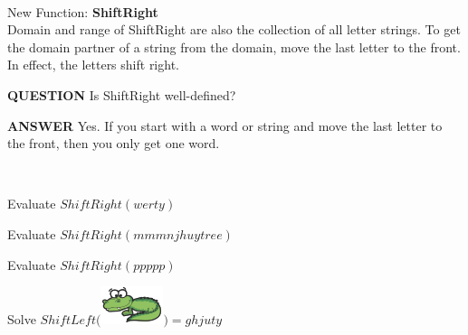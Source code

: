 \documentclass{ximera}
\begin{document}
\begin{exploration}
\quad \\
New Function: \textbf{ShiftRight} \\
Domain and range of ShiftRight are also the collection of all letter strings. To get the domain partner of a string from the domain, move the last letter to the front.  In effect, the letters shift right. \\


\begin{dialogue}
\item[\textbf{QUESTION}] Is ShiftRight well-defined?
\item[\textbf{ANSWER}] Yes. If you start with a word or string and move the last letter to the front, then you only get one word. 
\end{dialogue}
\quad \\


\begin{question}
Evaluate $ShiftRight(werty)$
\begin{multipleChoice}
\end{multipleChoice}
\end{question}



\begin{question}
Evaluate $ShiftRight(mmmnjhuytree)$
\begin{multipleChoice}
\end{multipleChoice}
\end{question}





\begin{question}
Evaluate $ShiftRight(ppppp)$
\begin{multipleChoice}
\end{multipleChoice}
\end{question}




\begin{question}
Solve $ShiftLeft($\includegraphics{pics/alligator.png}$) = ghjuty$
\begin{multipleChoice}
\end{multipleChoice}
\end{question}




\end{exploration}
\quad \\
\end{document}
